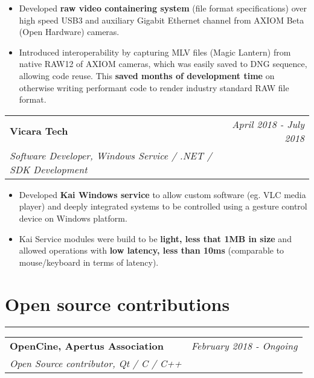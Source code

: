 \documentclass[9pt, a4paper]{article}
\begin{document}
\begin{itemize}
	\itemsep0em
	\item Developed \textbf{raw video containering system} (file format specifications) over high speed USB3 and auxiliary Gigabit Ethernet channel from AXIOM Beta (Open Hardware) cameras.
	\item Introduced interoperability by capturing MLV files (Magic Lantern) from native RAW12 of AXIOM cameras, which was easily saved to DNG sequence, allowing code reuse. This \textbf{saved months of development time} on otherwise writing performant code to render industry standard RAW file format.
\end{itemize}

\vspace{4px}
\hspace{5px}
\begin{tabularx}{\textwidth}{X r}
	\textbf{Vicara Tech} & \textit{April 2018 - July 2018} \\
	\textit{\small Software Developer, Windows Service / .NET / SDK Development} & \\
\end{tabularx}

\begin{itemize}
	\itemsep0em
	\item Developed \textbf{Kai Windows service} to allow custom software (eg. VLC media player) and deeply integrated systems to be controlled using a gesture control device on Windows platform.
	\item Kai Service modules were build to be \textbf{light, less that 1MB in size} and allowed operations with \textbf{low latency, less than 10ms} (comparable to mouse/keyboard in terms of latency).
\end{itemize}

\section*{Open source contributions}
\vspace{-8px}
\hrule
\vspace{4px}
\hspace{5px}
\begin{tabularx}{\textwidth}{X r}
	\textbf{OpenCine, Apertus Association} & \textit{February 2018 - Ongoing	} \\
	\textit{\small Open Source contributor, Qt / C / C++} & \\
\end{tabularx}
\end{document}
